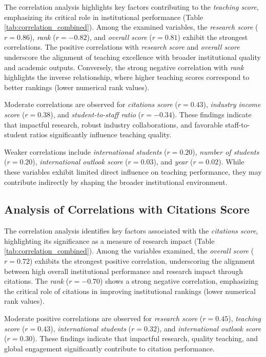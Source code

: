 \documentclass[conference]{IEEEtran}
\begin{document}
The correlation analysis highlights key factors contributing to the \textit{teaching score}, emphasizing its critical role in institutional performance (Table \ref{tab:correlation_combined}). Among the examined variables, the \textit{research score} ($r = 0.86$), \textit{rank} ($r = -0.82$), and \textit{overall score} ($r = 0.81$) exhibit the strongest correlations. The positive correlations with \textit{research score} and \textit{overall score} underscore the alignment of teaching excellence with broader institutional quality and academic outputs. Conversely, the strong negative correlation with \textit{rank} highlights the inverse relationship, where higher teaching scores correspond to better rankings (lower numerical rank values).

Moderate correlations are observed for \textit{citations score} ($r = 0.43$), \textit{industry income score} ($r = 0.38$), and \textit{student-to-staff ratio} ($r = -0.34$). These findings indicate that impactful research, robust industry collaborations, and favorable staff-to-student ratios significantly influence teaching quality.

Weaker correlations include \textit{international students} ($r = 0.20$), \textit{number of students} ($r = 0.20$), \textit{international outlook score} ($r = 0.03$), and \textit{year} ($r = 0.02$). While these variables exhibit limited direct influence on teaching performance, they may contribute indirectly by shaping the broader institutional environment.



\subsection{Analysis of Correlations with Citations Score}

The correlation analysis identifies key factors associated with the \textit{citations score}, highlighting its significance as a measure of research impact (Table \ref{tab:correlation_combined}). Among the variables examined, the \textit{overall score} ($r = 0.72$) exhibits the strongest positive correlation, underscoring the alignment between high overall institutional performance and research impact through citations. The \textit{rank} ($r = -0.70$) shows a strong negative correlation, emphasizing the critical role of citations in improving institutional rankings (lower numerical rank values).

Moderate positive correlations are observed for \textit{research score} ($r = 0.45$), \textit{teaching score} ($r = 0.43$), \textit{international students} ($r = 0.32$), and \textit{international outlook score} ($r = 0.30$). These findings indicate that impactful research, quality teaching, and global engagement significantly contribute to citation performance.
\end{document}
